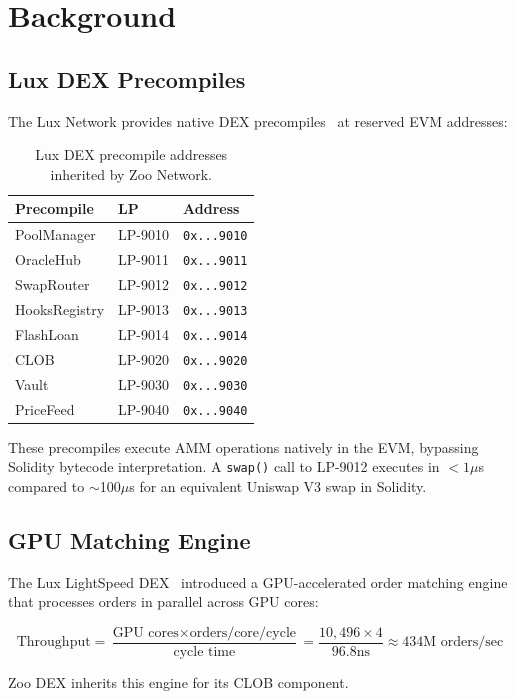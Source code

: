 \section{Background}


\subsection{Lux DEX Precompiles}

The Lux Network provides native DEX precompiles~\cite{lux-dex} at reserved EVM addresses:

\begin{table}[t]
\centering
\begin{tabular}{lll}
\toprule
\textbf{Precompile} & \textbf{LP} & \textbf{Address} \\
\midrule
PoolManager & LP-9010 & \texttt{0x...9010} \\
OracleHub & LP-9011 & \texttt{0x...9011} \\
SwapRouter & LP-9012 & \texttt{0x...9012} \\
HooksRegistry & LP-9013 & \texttt{0x...9013} \\
FlashLoan & LP-9014 & \texttt{0x...9014} \\
CLOB & LP-9020 & \texttt{0x...9020} \\
Vault & LP-9030 & \texttt{0x...9030} \\
PriceFeed & LP-9040 & \texttt{0x...9040} \\
\bottomrule
\end{tabular}
\caption{Lux DEX precompile addresses inherited by Zoo Network.}
\label{tab:precompiles}
\end{table}

These precompiles execute AMM operations natively in the EVM, bypassing Solidity bytecode interpretation. A \texttt{swap()} call to LP-9012 executes in $< 1\mu$s compared to $\sim$100$\mu$s for an equivalent Uniswap V3 swap in Solidity.

\subsection{GPU Matching Engine}

The Lux LightSpeed DEX~\cite{lux-lightspeed-dex} introduced a GPU-accelerated order matching engine that processes orders in parallel across GPU cores:

\begin{equation}
\text{Throughput} = \frac{\text{GPU cores} \times \text{orders/core/cycle}}{\text{cycle time}} = \frac{10,496 \times 4}{96.8\text{ns}} \approx 434\text{M orders/sec}
\end{equation}

Zoo DEX inherits this engine for its CLOB component.

